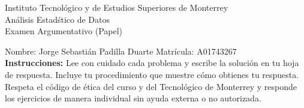 \documentclass[10pt]{report}
\begin{document}
\newpage



\begin{center}
{\large Instituto Tecnol\'{o}gico y de Estudios Superiores de Monterrey \\
An\'alisis Estad\'stico de Datos } \\
Examen Argumentativo (Papel)
\end{center}

Nombre: \underline{\hspace*{.2in}}
Jorge Sebasti\'an Padilla Duarte
\underline{\hspace*{.2in}} \quad Matr\'icula:\underline{\hspace*{.2in}}
A01743267
\underline{\hspace*{.2in}} \\

{\bf Instrucciones:} Lee con cuidado cada problema y escribe la soluci\'on
en tu hoja de respuesta. Incluye tu procedimiento que muestre c\'omo obtienes tu respuesta.  Respeta el c\'odigo de \'etica del curso y del Tecnol\'ogico de Monterrey y responde los ejercicios de manera individual sin ayuda externa o no autorizada.
\end{document}

